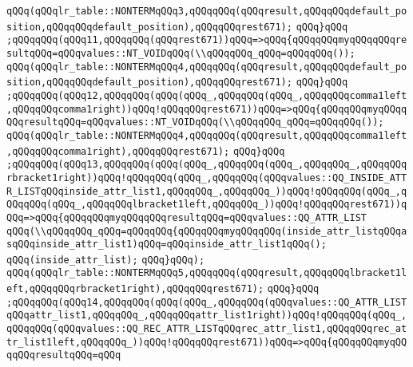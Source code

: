 \verb|qQQq(qQQqlr_table::NONTERMqQQq3,qQQqqQQq(qQQqresult,qQQqqQQqdefault_position,qQQqqQQqdefault_position),qQQqqQQqrest671);|\newline
\verb|qQQq}qQQq|\newline
\verb|;qQQqqQQq(qQQq11,qQQqqQQq(qQQqrest671))qQQq=>qQQq{qQQqqQQqmyqQQqqQQqresultqQQq=qQQqvalues::NT_VOIDqQQq(\\qQQqqQQq_qQQq=qQQqqQQq());|\newline
\verb|qQQq(qQQqlr_table::NONTERMqQQq4,qQQqqQQq(qQQqresult,qQQqqQQqdefault_position,qQQqqQQqdefault_position),qQQqqQQqrest671);|\newline
\verb|qQQq}qQQq|\newline
\verb|;qQQqqQQq(qQQq12,qQQqqQQq(qQQq(qQQq_,qQQqqQQq(qQQq_,qQQqqQQqcomma1left,qQQqqQQqcomma1right))qQQq!qQQqqQQqrest671))qQQq=>qQQq{qQQqqQQqmyqQQqqQQqresultqQQq=qQQqvalues::NT_VOIDqQQq(\\qQQqqQQq_qQQq=qQQqqQQq());|\newline
\verb|qQQq(qQQqlr_table::NONTERMqQQq4,qQQqqQQq(qQQqresult,qQQqqQQqcomma1left,qQQqqQQqcomma1right),qQQqqQQqrest671);|\newline
\verb|qQQq}qQQq|\newline
\verb|;qQQqqQQq(qQQq13,qQQqqQQq(qQQq(qQQq_,qQQqqQQq(qQQq_,qQQqqQQq_,qQQqqQQqrbracket1right))qQQq!qQQqqQQq(qQQq_,qQQqqQQq(qQQqvalues::QQ_INSIDE_ATTR_LISTqQQqinside_attr_list1,qQQqqQQq_,qQQqqQQq_))qQQq!qQQqqQQq(qQQq_,qQQqqQQq(qQQq_,qQQqqQQqlbracket1left,qQQqqQQq_))qQQq!qQQqqQQqrest671))qQQq=>qQQq{qQQqqQQqmyqQQqqQQqresultqQQq=qQQqvalues::QQ_ATTR_LIST|\newline
\verb|qQQq(\\qQQqqQQq_qQQq=qQQqqQQq{qQQqqQQqmyqQQqqQQq(inside_attr_listqQQqasqQQqinside_attr_list1)qQQq=qQQqinside_attr_list1qQQq();|\newline
\verb|qQQq(inside_attr_list);|\newline
\verb|qQQq}qQQq);|\newline
\verb|qQQq(qQQqlr_table::NONTERMqQQq5,qQQqqQQq(qQQqresult,qQQqqQQqlbracket1left,qQQqqQQqrbracket1right),qQQqqQQqrest671);|\newline
\verb|qQQq}qQQq|\newline
\verb|;qQQqqQQq(qQQq14,qQQqqQQq(qQQq(qQQq_,qQQqqQQq(qQQqvalues::QQ_ATTR_LISTqQQqattr_list1,qQQqqQQq_,qQQqqQQqattr_list1right))qQQq!qQQqqQQq(qQQq_,qQQqqQQq(qQQqvalues::QQ_REC_ATTR_LISTqQQqrec_attr_list1,qQQqqQQqrec_attr_list1left,qQQqqQQq_))qQQq!qQQqqQQqrest671))qQQq=>qQQq{qQQqqQQqmyqQQqqQQqresultqQQq=qQQq|\newline

